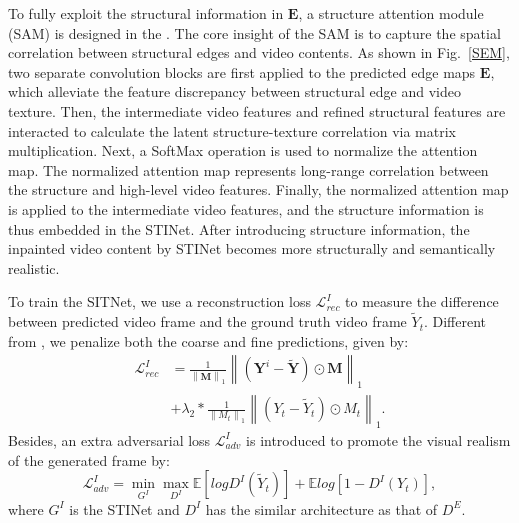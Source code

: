 To fully exploit the structural information in $\boldsymbol{E}$, a structure attention module (SAM) is designed in the .
The core insight of the SAM is to capture the spatial correlation between structural edges and video contents.
As shown in Fig.~\ref{SEM}, two separate convolution blocks are first applied to the predicted edge maps $\boldsymbol{E}$, which alleviate the feature discrepancy between structural edge and video texture.
Then, the intermediate video features and refined structural features are interacted to calculate the latent structure-texture correlation via matrix multiplication. 
Next, a SoftMax operation is used to normalize the attention map.
%
The normalized attention map represents long-range correlation between the structure and high-level video features.
Finally, the normalized attention map is applied to the intermediate video features, and the structure information is thus embedded in the STINet.
After introducing structure information, the inpainted video content by STINet becomes more structurally and semantically realistic.


 
To train the SITNet, we use a reconstruction loss $\mathcal{L}^{I}_{rec}$ to measure the difference between predicted video frame and the ground truth video frame $\widetilde{Y}_t$.
Different from \cite{nazeri2019edgeconnect}, we penalize both the coarse and fine predictions, given by:
%
\begin{equation}
	\begin{aligned}
		\mathcal{L}^{I}_{rec}&=\frac{1}{\left\|\boldsymbol{M} \right\|_1}\left\|(\boldsymbol{Y}^i-\widetilde{\boldsymbol{Y}})\odot \boldsymbol{M}\right\|_1\\ &+\lambda_2*\frac{1}{\left\|M_t \right\|_1}\left\|(Y_t-\widetilde{Y}_t)\odot M_t\right\|_1.
	\end{aligned}
\end{equation}
%
%
Besides, an extra adversarial loss $\mathcal{L}^I_{adv}$ is introduced to promote the visual realism of the generated frame by:
\begin{equation}
	\label{eq:inp_adver}
	\mathcal{L}^I_{adv}=\min\limits_{G^I} \max \limits_{D^I}\mathbb{E}[logD^I(\widetilde{Y}_t)]+\mathbb{E}log[1-D^I(Y_{t})],
\end{equation}
where $G^I$ is the STINet and $D^I$ has the similar architecture as that of $D^E$.%


